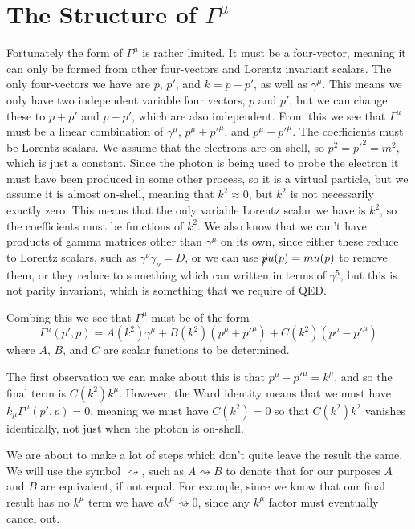 \documentclass[fleqn]{NotesClass}
\begin{document}
    \section{The Structure of \texorpdfstring{\(\Gamma^\mu\)}{Gamma}}
    Fortunately the form of \(\Gamma^\mu\) is rather limited.
    It must be a four-vector, meaning it can only be formed from other four-vectors and Lorentz invariant scalars.
    The only four-vectors we have are \(p\), \(p'\), and \(k = p - p'\), as well as \(\gamma^\mu\).
    This means we only have two independent variable four vectors, \(p\) and \(p'\), but we can change these to \(p + p'\) and \(p - p'\), which are also independent.
    From this we see that \(\Gamma^\mu\) must be a linear combination of \(\gamma^\mu\), \(p^\mu + p'^\mu\), and \(p^\mu - p'^\mu\).
    The coefficients must be Lorentz scalars.
    We assume that the electrons are on shell, so \(p^2 = p'^2 = m^2\), which is just a constant.
    Since the photon is being used to probe the electron it must have been produced in some other process, so it is a virtual particle, but we assume it is almost on-shell, meaning that \(k^2 \approx 0\), but \(k^2\) is not necessarily exactly zero.
    This means that the only variable Lorentz scalar we have is \(k^2\), so the coefficients must be functions of \(k^2\).
    We also know that we can't have products of gamma matrices other than \(\gamma^\mu\) on its own, since either these reduce to Lorentz scalars, such as \(\gamma^\nu \gamma_\nu = D\), or we can use \(\slashed{p}u(p) = mu(p)\) to remove them, or they reduce to something which can written in terms of \(\gamma^5\), but this is not parity invariant, which is something that we require of QED.
    
    Combing this we see that \(\Gamma^\mu\) must be of the form
    \begin{equation}
        \Gamma^\mu(p', p) = A(k^2) \gamma^\mu + B(k^2)(p^\mu + p'^\mu) + C(k^2)(p^\mu - p'^\mu)
    \end{equation}
    where \(A\), \(B\), and \(C\) are scalar functions to be determined.
    
    The first observation we can make about this is that \(p^\mu - p'^\mu = k^\mu\), and so the final term is \(C(k^2) k^\mu\).
    However, the Ward identity means that we must have \(k_\mu \Gamma^\mu(p', p) = 0\), meaning we must have \(C(k^2) = 0\) so that \(C(k^2)k^2\) vanishes identically, not just when the photon is on-shell.
    
    \begin{ntn}{}{}
        We are about to make a lot of steps which don't quite leave the result the same.
        We will use the symbol \(\rightsquigarrow\), such as \(A \rightsquigarrow B\) to denote that for our purposes \(A\) and \(B\) are equivalent, if not equal.
        For example, since we know that our final result has no \(k^\mu\) term we have \(ak^\mu \rightsquigarrow 0\), since any \(k^\mu\) factor must eventually cancel out.
    \end{ntn}
    
\end{document}
